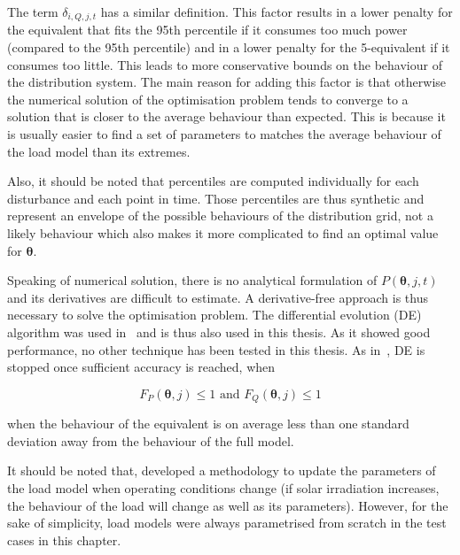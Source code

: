 The term \(\delta_{i, Q, j, t}\) has a similar definition. This factor results in a lower penalty for the equivalent that fits the 95th percentile if it consumes too much power (compared to the 95th percentile) and in a lower penalty for the 5-equivalent if it consumes too little. This leads to more conservative bounds on the behaviour of the distribution system. The main reason for adding this factor is that otherwise the numerical solution of the optimisation problem tends to converge to a solution that is closer to the average behaviour than expected. This is because it is usually easier to find a set of parameters to matches the average behaviour of the load model than its extremes.

Also, it should be noted that percentiles are computed individually for each disturbance and each point in time. Those percentiles are thus synthetic and represent an envelope of the possible behaviours of the distribution grid, not a likely behaviour which also makes it more complicated to find an optimal value for \(\bm{\theta}\).

Speaking of numerical solution, there is no analytical formulation of \(P(\bm{\theta}, j, t)\) and its derivatives are difficult to estimate. A derivative-free approach is thus necessary to solve the optimisation problem. The differential evolution (DE) algorithm was used in~\cite{ChaspierreThesis, ChaspierrePaper} and is thus also used in this thesis. As it showed good performance, no other technique has been tested in this thesis. As in~\cite{ChaspierreThesis, ChaspierrePaper}, DE is stopped once sufficient accuracy is reached, \eg when

\begin{equation}
    \label{eq:equivalent_stop}
    F_P(\bm{\theta}, j) \leq 1 \text{ and } F_Q(\bm{\theta}, j) \leq 1
\end{equation}

\noindent \ie when the behaviour of the equivalent is on average less than one standard deviation away from the behaviour of the full model.

It should be noted that, \cite{ChaspierreThesis} developed a methodology to update the parameters of the load model when operating conditions change (\eg if solar irradiation increases, the behaviour of the load will change as well as its parameters). However, for the sake of simplicity, load models were always parametrised from scratch in the test cases in this chapter.


